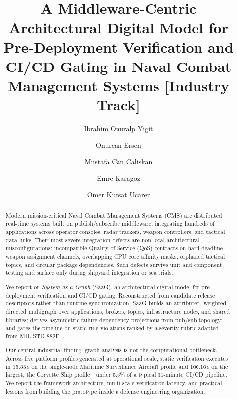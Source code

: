 \documentclass[sigconf,9pt]{acmart}
\begin{document}
\title[Middleware-Centric Architectural Digital Model for Naval CMS]{A Middleware-Centric Architectural Digital Model for Pre-Deployment Verification and CI/CD Gating in Naval Combat Management Systems [Industry Track]}

\author{Ibrahim Onuralp Yigit}

\author{Onurcan Ersen}

\author{Mustafa Can Caliskan}

\author{Emre Karagoz}

\author{Omer Kursat Ucarer}

\begin{abstract}
Modern mission-critical Naval Combat Management Systems (CMS) are distributed real-time systems built on publish/subscribe middleware, integrating hundreds of applications across operator consoles, radar trackers, weapon controllers, and tactical data links. Their most severe integration defects are non-local architectural misconfigurations: incompatible Quality-of-Service (QoS) contracts on hard-deadline weapon assignment channels, overlapping CPU core affinity masks, orphaned tactical topics, and circular package dependencies. Such defects survive unit and component testing and surface only during shipyard integration or sea trials.

We report on \emph{System as a Graph} (SaaG), an architectural digital model for pre-deployment verification and CI/CD gating. Reconstructed from candidate release descriptors rather than runtime synchronization, SaaG builds an attributed, weighted directed multigraph over applications, brokers, topics, infrastructure nodes, and shared libraries; derives asymmetric failure-dependency projections from pub/sub topology; and gates the pipeline on static rule violations ranked by a severity rubric adapted from MIL-STD-882E~\cite{milstd882e}.

Our central industrial finding: graph analysis is not the computational bottleneck. Across five platform profiles generated at operational scale, static verification executes in 15.53\,s on the single-node Maritime Surveillance Aircraft profile and 100.16\,s on the largest, the Corvette Ship profile---under 5.6\% of a typical 30-minute CI/CD pipeline. We report the framework architecture, multi-scale verification latency, and practical lessons from building the prototype inside a defense engineering organization.

\end{abstract}
\end{document}
